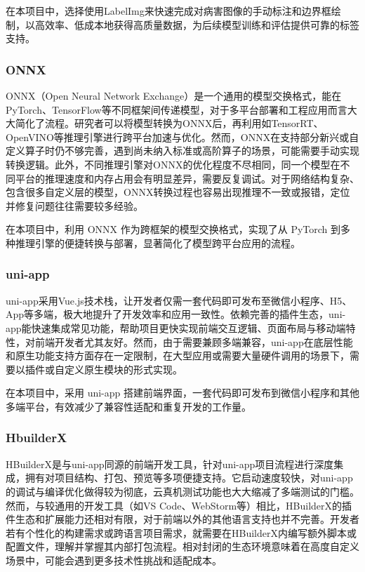 在本项目中，选择使用LabelImg来快速完成对病害图像的手动标注和边界框绘制，以高效率、低成本地获得高质量数据，为后续模型训练和评估提供可靠的标签支持。

\subsubsection{ONNX}
ONNX（Open Neural Network Exchange）是一个通用的模型交换格式，能在PyTorch、TensorFlow等不同框架间传递模型，对于多平台部署和工程应用而言大大简化了流程。研究者可以将模型转换为ONNX后，再利用如TensorRT、OpenVINO等推理引擎进行跨平台加速与优化。然而，ONNX在支持部分新兴或自定义算子时仍不够完善，遇到尚未纳入标准或高阶算子的场景，可能需要手动实现转换逻辑。此外，不同推理引擎对ONNX的优化程度不尽相同，同一个模型在不同平台的推理速度和内存占用会有明显差异，需要反复调试。对于网络结构复杂、包含很多自定义层的模型，ONNX转换过程也容易出现推理不一致或报错，定位并修复问题往往需要较多经验。

在本项目中，利用 ONNX 作为跨框架的模型交换格式，实现了从 PyTorch 到多种推理引擎的便捷转换与部署，显著简化了模型跨平台应用的流程。

\subsubsection{uni-app}
uni-app采用Vue.js技术栈，让开发者仅需一套代码即可发布至微信小程序、H5、App等多端，极大地提升了开发效率和应用一致性。依赖完善的插件生态，uni-app能快速集成常见功能，帮助项目更快实现前端交互逻辑、页面布局与移动端特性，对前端开发者尤其友好。然而，由于需要兼顾多端兼容，uni-app在底层性能和原生功能支持方面存在一定限制，在大型应用或需要大量硬件调用的场景下，需要以插件或自定义原生模块的形式实现。

在本项目中，采用 uni-app 搭建前端界面，一套代码即可发布到微信小程序和其他多端平台，有效减少了兼容性适配和重复开发的工作量。

\subsubsection{HbuilderX}
HBuilderX是与uni-app同源的前端开发工具，针对uni-app项目流程进行深度集成，拥有对项目结构、打包、预览等多项便捷支持。它启动速度较快，对uni-app的调试与编译优化做得较为彻底，云真机测试功能也大大缩减了多端测试的门槛。然而，与较通用的开发工具（如VS Code、WebStorm等）相比，HBuilderX的插件生态和扩展能力还相对有限，对于前端以外的其他语言支持也并不完善。开发者若有个性化的构建需求或跨语言项目需求，就需要在HBuilderX内编写额外脚本或配置文件，理解并掌握其内部打包流程。相对封闭的生态环境意味着在高度自定义场景中，可能会遇到更多技术性挑战和适配成本。

